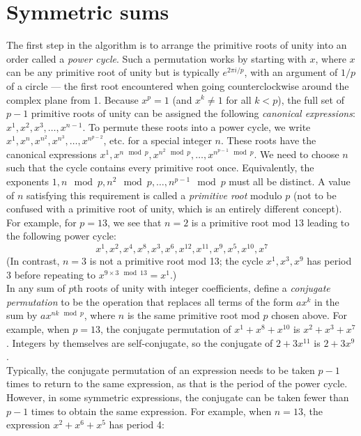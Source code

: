 \documentclass{article}
\begin{document}
\section{Symmetric sums}
	The first step in the algorithm is to arrange the primitive roots of unity into an order called a \textit{power cycle}. Such a permutation works by starting with $ x $, where $ x $ can be any primitive root of unity but is typically $ e^{2\pi i/p} $, with an argument of $ 1/p $ of a circle --- the first root encountered when going counterclockwise around the complex plane from 1. Because $ x^p = 1 $ (and $ x^k \ne 1 $ for all $ k < p $), the full set of $ p - 1 $ primitive roots of unity can be assigned the following \textit{canonical expressions}: $ x^1, x^2, x^3, \dots, x^{n - 1} $. To permute these roots into a power cycle, we write $ x^1, x^n, x^{n^2}, x^{n^3}, \dots, x^{n^{p - 2}} $, etc. for a special integer $ n $. These roots have the canonical expressions $ x^1, x^{n \mod p}, x^{n^2 \mod p}, \dots, x^{n^{p - 1} \mod p} $. We need to choose $ n $ such that the cycle contains every primitive root once. Equivalently, the exponents $ 1, n \mod p, n^2 \mod p, \dots, n^{p - 1} \mod p $ must all be distinct. A value of $ n $ satisfying this requirement is called a \textit{primitive root} modulo $ p $ (not to be confused with a primitive root of unity, which is an entirely different concept).
	For example, for $ p = 13 $, we see that $ n = 2 $ is a primitive root mod 13 leading to the following power cycle:
	$$ x^1, x^2, x^4, x^8, x^3, x^6, x^{12}, x^{11}, x^9, x^5, x^{10}, x^7 $$
	(In contrast, $ n = 3 $ is not a primitive root mod 13; the cycle $ x^1, x^3, x^9 $ has period 3 before repeating to $ x^{9 \times 3 \mod 13} = x^1 $.)\\
	In any sum of $ p $th roots of unity with integer coefficients, define a \textit{conjugate permutation} to be the operation that replaces all terms of the form $ ax^k $ in the sum by $ ax^{nk \mod p} $, where $ n $ is the same primitive root mod $ p $ chosen above. For example, when $ p = 13 $, the conjugate permutation of $ x^1 + x^8 + x^{10} $ is $ x^2 + x^3 + x^7 $. Integers by themselves are self-conjugate, so the conjugate of $ 2 + 3x^{11} $ is $ 2 + 3x^9 $.\\
	Typically, the conjugate permutation of an expression needs to be taken $ p - 1 $ times to return to the same expression, as that is the period of the power cycle. However, in some symmetric expressions, the conjugate can be taken fewer than $ p - 1 $ times to obtain the same expression. For example, when $ n = 13 $, the expression $ x^2 + x^6 + x^5 $ has period 4:
\end{document}
